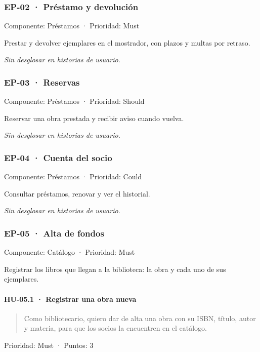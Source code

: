 \subsubsection*{EP-02 · Préstamo y devolución}

Componente: Préstamos · Prioridad: Must

Prestar y devolver ejemplares en el mostrador, con plazos y multas por retraso.

\emph{Sin desglosar en historias de usuario.}

\subsubsection*{EP-03 · Reservas}

Componente: Préstamos · Prioridad: Should

Reservar una obra prestada y recibir aviso cuando vuelva.

\emph{Sin desglosar en historias de usuario.}

\subsubsection*{EP-04 · Cuenta del socio}

Componente: Préstamos · Prioridad: Could

Consultar préstamos, renovar y ver el historial.

\emph{Sin desglosar en historias de usuario.}

\subsubsection*{EP-05 · Alta de fondos}

Componente: Catálogo · Prioridad: Must

Registrar los libros que llegan a la biblioteca: la obra y cada uno de sus ejemplares.

\paragraph*{HU-05.1 · Registrar una obra nueva}

\begin{quote}
Como bibliotecario, quiero dar de alta una obra con su ISBN, título, autor y materia, para que los socios la encuentren en el catálogo.
\end{quote}

Prioridad: Must · Puntos: 3


